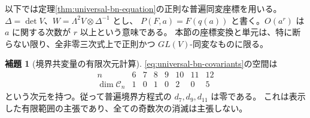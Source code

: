 \documentclass[a4paper,11pt]{ltjsarticle}
\theoremstyle{definition}
\newtheorem{lemma}[theorem]{補題}
\begin{document}
以下では定理\ref{thm:universal-bn-equation}の正則な普遍同変座標を用いる。
$\Delta=\det V$、$W=\Lambda^2V\otimes\Delta^{-1}$ とし、
$P(F,a)=F(q(a))$ と書く。$O(a^r)$ は $a$ に関する次数が $r$ 以上という意味である。
本節の座標変換と単元は、特に断らない限り、全非零三次式上で正則かつ
$GL(V)$-同変なものに限る。

\begin{lemma}[境界共変量の有限次元計算]\label{lem:boundary-covariant-dimensions}
\eqref{eq:universal-bn-covariants}の空間は
\[
\begin{array}{c|rrrrrrr}
 n&6&7&8&9&10&11&12\\ \hline
 \dim\mathcal C_n&1&0&1&0&2&0&5
\end{array}
\]
という次元を持つ。従って普遍境界方程式の $d_7,d_9,d_{11}$ は零である。
これは表示した有限範囲の主張であり、全ての奇数次の消滅は主張しない。
\end{lemma}
\end{document}
